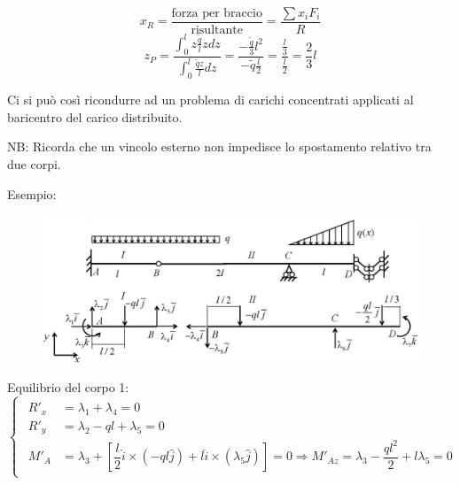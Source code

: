 \documentclass{article}
\begin{document}
\begin{adjustwidth}{2in}{}
\[
x_{R} = \frac{\text{forza per braccio}}{\text{risultante}} = \frac{\sum{x_{i}F_{i}}}{R}
\]
\[
z_P = \frac{\int_{0}^{l} z \frac{\tilde{q}}{l} zdz}{\int_{0}^{l}\frac{\tilde{q}z}{l}dz} = \frac{-\frac{\tilde{q}}{3} l^2 }{-\tilde{q} \frac{l}{2}} = \frac{\frac{l}{3}}{\frac{l}{2}} = \frac{2}{3}l
\]

Ci si può così ricondurre ad un problema di carichi concentrati applicati al baricentro del carico distribuito. \newline 

NB: Ricorda che un vincolo esterno non impedisce lo spostamento relativo tra due corpi. \newline

Esempio: \newline 

\begin{figure}[H]
	\centering
	\includegraphics[width=0.4\linewidth]{immagini/1.PARTE2_esempio mancante}
\end{figure} 

Equilibrio del corpo 1:
\[ \begin{cases}
	\begin{aligned}
		R'_x & = \lambda_1 + \lambda_4 = 0 \\
		R'_y & = \lambda_2 - ql + \lambda_5  = 0\\
		M'_A & = \lambda_3 + \left[ \dfrac{l}{2}\hat{i}\times (-ql\hat{j}) + l\hat{i}\times (\lambda_5\hat{j})\right]  = 0 \Rightarrow M'_{Az} = \lambda_3 -\dfrac{ql^2}{2} + l\lambda_5 = 0
	\end{aligned}
\end{cases}\]


\end{adjustwidth}
\end{document}
